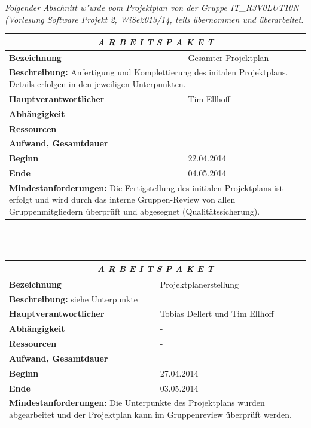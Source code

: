 \documentclass[fontsize=12pt,paper=a4,twoside]{scrartcl}
\begin{document}
\textit{Folgender Abschnitt w"urde vom Projektplan von der Gruppe IT\_R3V0LUT10N (Vorlesung Software Projekt 2, WiSe2013/14, teils übernommen und überarbeitet.}


\begin{tabular}{p{7.5cm}|p{7.5cm}}\toprule
\multicolumn{2}{c}{\textbf{\textit{A R B E I T S P A K E T \quad 1}}} \\ \toprule \hline
\textbf{Bezeichnung} & Gesamter Projektplan\\\hline
\multicolumn{2}{p{15cm}}{\textbf{Beschreibung:} \newline 
Anfertigung und Komplettierung des initalen Projektplans. Details erfolgen in den jeweiligen Unterpunkten.}  \\\hline
\textbf{Hauptverantwortlicher} & Tim Ellhoff\\\hline
\textbf{Abhängigkeit} & -\\\hline
\textbf{Ressourcen} & -\\\hline
\textbf{Aufwand, Gesamtdauer} & \\\hline
\textbf{Beginn} & 22.04.2014 \\\hline
\textbf{Ende} & 04.05.2014\\\hline
\multicolumn{2}{p{15cm}}{\textbf{Mindestanforderungen: } \newline
Die Fertigstellung des initialen Projektplans ist erfolgt und wird durch das interne Gruppen-Review von allen Gruppenmitgliedern überprüft und abgesegnet (Qualitätssicherung).}  \\ \toprule
\end{tabular} \\\\

\begin{tabular}{p{7.5cm}|p{7.5cm}}\toprule
\multicolumn{2}{c}{\textbf{\textit{A R B E I T S P A K E T \quad 1.1}}} \\ \toprule \hline
\textbf{Bezeichnung} & Projektplanerstellung\\\hline
\multicolumn{2}{p{15cm}}{\textbf{Beschreibung:} \newline 
siehe Unterpunkte}  \\\hline
\textbf{Hauptverantwortlicher} & Tobias Dellert und Tim Ellhoff\\\hline
\textbf{Abhängigkeit} & -\\\hline
\textbf{Ressourcen} & -\\\hline
\textbf{Aufwand, Gesamtdauer} & \\\hline
\textbf{Beginn} & 27.04.2014 \\\hline
\textbf{Ende} & 03.05.2014\\\hline
\multicolumn{2}{p{15cm}}{\textbf{Mindestanforderungen: } \newline
Die Unterpunkte des Projektplans wurden abgearbeitet und der Projektplan kann im Gruppenreview überprüft werden.}  \\ \toprule
\end{tabular} \\\\
\end{document}
